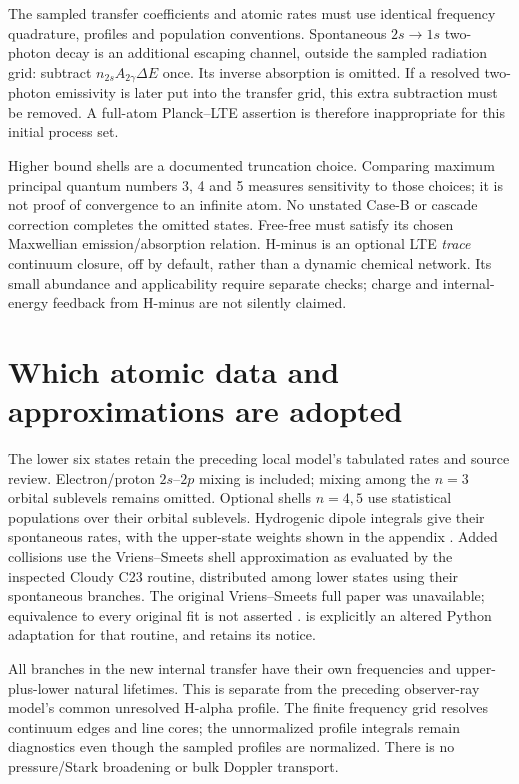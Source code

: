 \documentclass[11pt,a4paper]{article}
\begin{document}
The sampled transfer coefficients and atomic rates must use identical
frequency quadrature, profiles and population conventions. Spontaneous
$2s\to1s$ two-photon decay is an additional escaping channel, outside the
sampled radiation grid: subtract $n_{2s}A_{2\gamma}\Delta E$ once. Its inverse
absorption is omitted. If a resolved two-photon emissivity is later put into
the transfer grid, this extra subtraction must be removed. A full-atom
Planck--LTE assertion is therefore inappropriate for this initial process set.

Higher bound shells are a documented truncation choice. Comparing maximum
principal quantum numbers 3, 4 and 5 measures sensitivity to those choices;
it is not proof of convergence to an infinite atom. No unstated Case-B or
cascade correction completes the omitted states. Free-free must satisfy its
chosen Maxwellian emission/absorption relation. H-minus is an optional LTE
\emph{trace} continuum closure, off by default, rather than a dynamic chemical
network. Its small abundance and applicability require separate checks; charge
and internal-energy feedback from H-minus are not silently claimed.

\section{Which atomic data and approximations are adopted}
The lower six states retain the preceding local model's tabulated rates and
source review. Electron/proton $2s$--$2p$ mixing is included; mixing among the
$n=3$ orbital sublevels remains omitted. Optional shells $n=4,5$ use statistical populations over their
orbital sublevels. Hydrogenic dipole integrals give their spontaneous rates,
with the upper-state weights shown in the appendix \cite{prozesky}. Added
collisions use the Vriens--Smeets shell approximation as evaluated by the
inspected Cloudy C23 routine, distributed among lower states using their
spontaneous branches. The original Vriens--Smeets full paper was unavailable;
equivalence to every original fit is not asserted \cite{vs80,cloudy}.
 is explicitly an altered Python adaptation for that
routine, and  retains its notice.

All branches in the new internal transfer have their own frequencies and
upper-plus-lower natural lifetimes. This is separate from the preceding
observer-ray model's common unresolved H-alpha profile. The finite frequency
grid resolves continuum edges and line cores; the unnormalized profile
integrals remain diagnostics even though the sampled profiles are normalized.
There is no pressure/Stark broadening or bulk Doppler transport.
\end{document}
